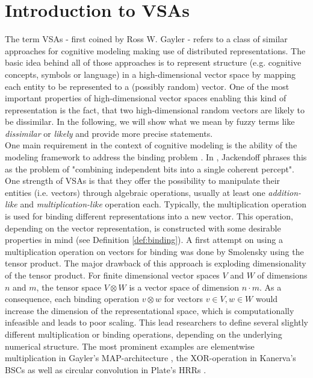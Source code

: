 \chapter{Introduction to \aclp{VSA}}
The term \acfp{VSA} - first coined by Ross W. Gayler \cite{Gayler2003} - refers to a class of similar approaches for cognitive modeling making use of distributed representations.
The basic idea behind all of those approaches is to represent structure (e.g. cognitive concepts, symbols or language) in a high-dimensional vector space by mapping each entity to be represented to a (possibly random) vector.
One of the most important properties of high-dimensional vector spaces enabling this kind of representation is the fact, that two high-dimensional random vectors are likely to be dissimilar.
In the following, we will show what we mean by fuzzy terms like \emph{dissimilar} or \emph{likely} and provide more precise statements.\\
One main requirement in the context of cognitive modeling is the ability of the modeling framework to address the binding problem \cite{Treisman1999}.
In \cite{Jackendoff2002}, Jackendoff phrases this as the problem of "combining independent bits into a single coherent percept". 
One strength of \acp{VSA} is that they offer the possibility to manipulate their entities (i.e. vectors) through algebraic operations, usually at least one \emph{addition-like} and \emph{multiplication-like} operation each.
Typically, the multiplication operation is used for binding different representations into a new vector.
This operation, depending on the vector representation, is constructed with some desirable properties in mind (see Definition \ref{def:binding}).
A first attempt on using a multiplication operation on vectors for binding was done by Smolensky \cite{Smolensky1990} using the tensor product.
The major drawback of this approach is exploding dimensionality of the tensor product.
For finite dimensional vector spaces  $V$ and $W$ of dimensions $n$ and $m$, the tensor space $V \otimes W$ is a vector space of dimension $n\cdot m$.
As a consequence, each binding operation $v\otimes w$ for vectors $v \in V, w \in W$ would increase the dimension of the representational space, which is computationally infeasible and leads to poor scaling.
This lead researchers to define several slightly different multiplication or binding operations, depending on the underlying numerical structure.
The most prominent examples are elementwise multiplication in Gayler's \ac{MAP}-architecture \cite{Gayler1998}, the XOR-operation in Kanerva's \acp{BSC} \cite{Kanerva2000, Kanerva2009} as well as circular convolution in Plate's \acp{HRR} \cite{Plate1991, Plate1994}.

